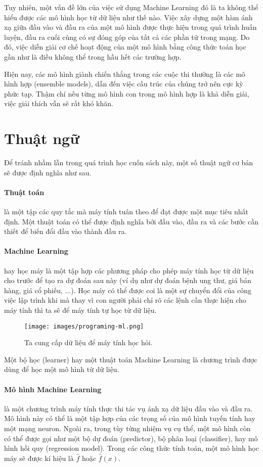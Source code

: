 Tuy nhiên, một vấn đề lớn của việc sử dụng Machine Learning đó là ta không thể hiểu được các mô hình học từ dữ liệu như thế nào. Việc xây dựng một hàm ánh xạ giữa đầu vào và đầu ra của một mô hình được thực hiện trong quá trình huấn luyện, đầu ra cuối cùng có sự đóng góp của tất cả các phần tử trong mạng. Do đó, việc diễn giải cơ chế hoạt động của một mô hình bằng công thức toán học gần như là điều không thể trong hầu hết các trường hợp. 

Hiện nay, các mô hình giành chiến thắng trong các cuộc thi thường là các mô hình hợp (ensemble models), dẫn đến việc cấu trúc của chúng trở nên cực kỳ phức tạp. Thậm chí nếu từng mô hình con trong mô hình hợp là khả diễn giải, việc giải thích vẫn sẽ rất khó khăn.

\clearpage
\section{Thuật ngữ}
Để tránh nhầm lẫn trong quá trình học cuốn sách này, một số thuật ngữ cơ bản sẽ được định nghĩa như sau.

\paragraph{Thuật toán} là một tập các quy tắc mà máy tính tuân theo để đạt được một mục tiêu nhất định. Một thuật toán có thể được định nghĩa bởi đầu vào, đầu ra và các bước cần thiết để biến đổi đầu vào thành đầu ra.

\paragraph{Machine Learning} hay học máy là một tập hợp các phương pháp cho phép máy tính học từ dữ liệu cho trước để tạo ra dự đoán sau này (ví dụ như dự đoán bệnh ung thư, giá bán hàng, giá cổ phiếu, ...). Học máy có thể được coi là một sự chuyển đổi của công việc lập trình khi mà thay vì con người phải chỉ rõ các lệnh cần thực hiện cho máy tính thì ta sẽ để máy tính tự học từ dữ liệu. 
\begin{figure*}[ht!]
	\centering
	\texttt{[image: images/programing-ml.png]}
	\caption{Ta cung cấp dữ liệu để máy tính học hỏi.}
\end{figure*}

Một bộ học (learner) hay một thuật toán Machine Learning là chương trình được dùng để học một mô hình từ dữ liệu. 

\paragraph{Mô hình Machine Learning} là một chương trình máy tính thực thi tác vụ ánh xạ dữ liệu đầu vào và đầu ra. Mô hình này có thể là một tập hợp của các trọng số của mô hình tuyến tính hay một mạng neuron. Ngoài ra, trong tùy từng nhiệm vụ cụ thể, một mô hình còn có thể được gọi như một bộ dự đoán (predictor), bộ phân loại (classifier), hay mô hình hồi quy (regression model). Trong các công thức tính toán, một mô hình học máy sẽ được kí hiệu là $\hat{f}$ hoặc $\hat{f}(x)$. 


